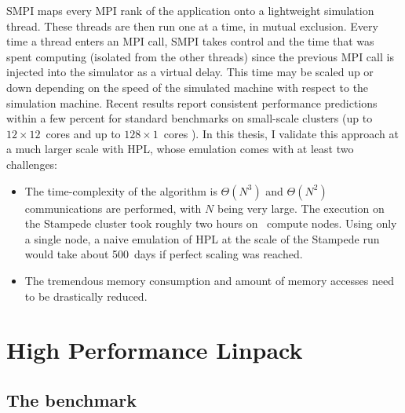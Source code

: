        SMPI maps every MPI rank of the application onto a lightweight simulation thread. These threads are then run one at
        a time, \ie in mutual exclusion.  Every time a thread enters an MPI call, SMPI takes control and the time that was
        spent computing (isolated from the other threads) since the previous MPI call is injected into the simulator as a
        virtual delay.  This time may be scaled up or down depending on the speed of the simulated machine with respect to
        the simulation machine.
        Recent results report consistent performance predictions within a few percent for standard benchmarks on small-scale
        clusters (up to \(12\times12\) cores \cite{heinrich:hal-01523608} and up to \(128\times1\) cores \cite{smpi}). In
        this thesis, I validate this approach at a much larger scale with HPL, whose emulation comes with at least two
        challenges:
        \begin{itemize}
        \item The time-complexity of the algorithm is \(\Theta(N^3)\) and \(\Theta(N^2)\) communications are performed, with
            \(N\) being very large. The execution on the Stampede cluster took roughly two hours on ~compute
            nodes. Using only a single node, a naive emulation of HPL at the scale of the Stampede run would take about
            500 days if perfect scaling was reached.
        \item The tremendous memory consumption and amount of memory accesses need to be drastically reduced.
        \end{itemize}

\chapter{High Performance Linpack}%
\label{chapter:prediction:hpl}

    \section{The benchmark}%
    \label{sec:hpl:benchmark}

